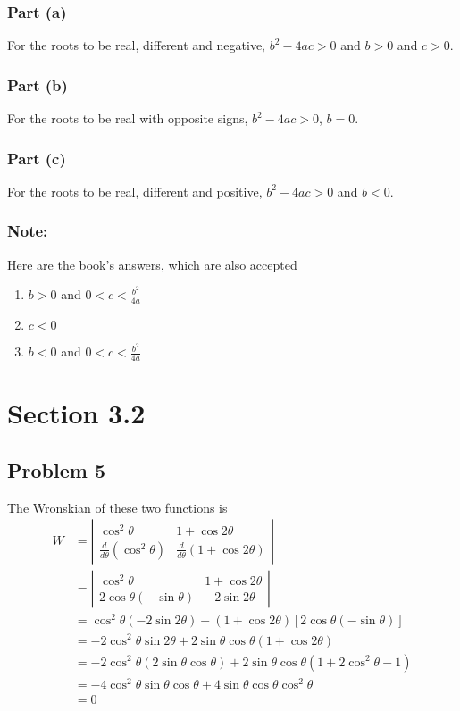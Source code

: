 \documentclass[12pt]{article}
\begin{document}
\subsubsection*{Part (a)}
\label{sec:orgc30fbac}
For the roots to be real, different and negative, \(b^2 - 4ac > 0\) and \(b>0\)
and \(c>0\).
\subsubsection*{Part (b)}
\label{sec:org0073ea2}
For the roots to be real with opposite signs, \(b^2 - 4ac > 0\), \(b = 0\).
\subsubsection*{Part (c)}
\label{sec:org70e8dc4}
For the roots to be real, different and positive, \(b^2-4ac>0\) and \(b<0\).
\subsubsection*{Note:}
\label{sec:orge2071f1}
Here are the book's answers, which are also accepted
\begin{enumerate}
\item \(b>0\) and \(0 < c < \frac{b^2}{4a}\)
\item \(c<0\)
\item \(b<0\) and \(0 < c < \frac{b^2}{4a}\)
\end{enumerate}
\section*{Section 3.2}
\label{sec:org21dbecf}
\subsection*{Problem 5}
\label{sec:org4988b14}
The Wronskian of these two functions is
\begin{align*}
W &=\left|\begin{array}{cc}
\cos ^{2} \theta & 1+\cos 2 \theta \\
\frac{d}{d \theta}\left(\cos ^{2} \theta\right) & \frac{d}{d \theta}(1+\cos 2 \theta)
\end{array}\right| \\
&=\left|\begin{array}{cc}
\cos ^{2} \theta & 1+\cos 2 \theta \\
2 \cos \theta(-\sin \theta) & -2 \sin 2 \theta
\end{array}\right| \\
&=\cos ^{2} \theta(-2 \sin 2 \theta)-(1+\cos 2 \theta)[2 \cos \theta(-\sin \theta)] \\
&=-2 \cos ^{2} \theta \sin 2 \theta+2 \sin \theta \cos \theta(1+\cos 2 \theta) \\
&=-2 \cos ^{2} \theta(2 \sin \theta \cos \theta)+2 \sin \theta \cos \theta\left(1+2 \cos ^{2} \theta-1\right) \\
&=-4 \cos ^{2} \theta \sin \theta \cos \theta+4 \sin \theta \cos \theta \cos ^{2} \theta \\
&=0
\end{align*}
\end{document}
